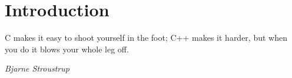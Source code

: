 
\chapter{Introduction}
\epigraph{C makes it easy to shoot yourself in the foot;
C++ makes it harder, but when you do it blows your whole leg off.}{\textit{Bjarne Stroustrup}}


